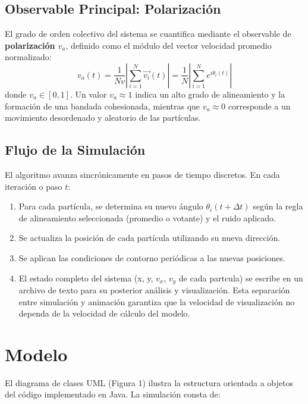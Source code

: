 \documentclass{article}
\begin{document}
\subsection{Observable Principal: Polarización}
El grado de orden colectivo del sistema se cuantifica mediante el observable de \textbf{polarización $v_a$}, definido como el módulo del vector velocidad promedio normalizado:
\begin{equation}
v_a(t) = \frac{1}{N v} \left| \sum_{i=1}^{N} \vec{v_i}(t) \right| = \frac{1}{N} \left| \sum_{i=1}^{N} e^{i \theta_i(t)} \right|
\label{eq:posicion}
\end{equation}
donde $v_a \in [0, 1]$. Un valor $v_a \approx 1$ indica un alto grado de alineamiento y la formación de una bandada cohesionada, mientras que $v_a \approx 0$ corresponde a un movimiento desordenado y aleatorio de las partículas.

\subsection{Flujo de la Simulación}
El algoritmo avanza sincrónicamente en pasos de tiempo discretos. En cada iteración o paso $t$:
\begin{enumerate}
\item Para cada partícula, se determina su nuevo ángulo $\theta_i(t + \Delta t)$ según la regla de alineamiento seleccionada (promedio o votante) y el ruido aplicado.
\item Se actualiza la posición de cada partícula utilizando su nueva dirección.
\item Se aplican las condiciones de contorno periódicas a las nuevas posiciones.
\item El estado completo del sistema (x, y, $v_x$, $v_y$ de cada partcula) se escribe en un archivo de texto para su posterior análisis y visualización. Esta separación entre simulación y animación garantiza que la velocidad de visualización no dependa de la velocidad de cálculo del modelo.
\end{enumerate}

\section{Modelo}
El diagrama de clases UML (Figura 1) ilustra la estructura orientada a objetos del código implementado en Java. La simulación consta de:
\end{document}
